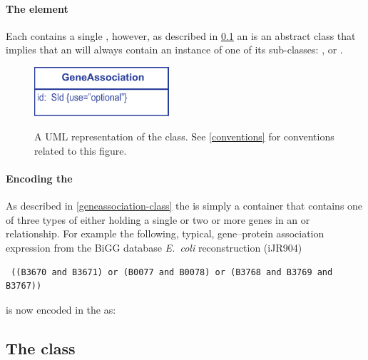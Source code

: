 \paragraph{The  element}
Each \GeneAssociation contains a single \Association, however, as described in \ref{association-class} an \Association is an abstract class that implies that an  will always contain an instance of one of its sub-classes: \GeneAnd, \GeneOr or \Gene.
%
\begin{figure}[h!]
  \centering
  \includegraphics[width=5cm]{images/fbc_uml_ga.pdf}\\
  \caption{A UML representation of the \FBCPackage \GeneAssociation class. See  \ref{conventions} for conventions related to this figure.}
  \label{fig:fbc_uml_ga}
\end{figure}

\paragraph{Encoding the \GeneAssociation}
As described in \ref{geneassociation-class} the \GeneAssociation is simply a container that contains one of three types of \Association either holding a single \Gene or two or more genes in an \GeneAnd or \GeneOr relationship. For example the following, typical, gene--protein association expression from the BiGG database \emph{E.~coli} reconstruction (iJR904) \cite{ijr904, bigg}
%
\begin{verbatim}
 ((B3670 and B3671) or (B0077 and B0078) or (B3768 and B3769 and B3767))
\end{verbatim}
%
is now encoded in the \FBCPackage as:
%
\subsection{The \FBC {} class}
\label{association-class}

